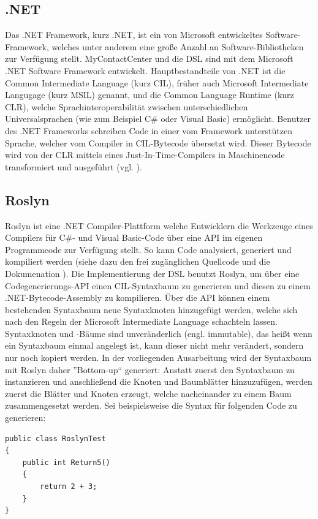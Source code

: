 \subsection{.NET}
\label{subsec:DotNet}
Das .NET Framework, kurz .NET, ist ein von Microsoft entwickeltes Software-Framework, welches unter anderem eine große Anzahl an Software-Bibliotheken zur Verfügung stellt. MyContactCenter und die DSL sind mit dem Microsoft .NET Software Framework entwickelt. Hauptbestandteile von .NET ist die Common Intermediate Language (kurz CIL), früher auch Microsoft Intermediate Langugage (kurz MSIL) genannt, und die Common Language Runtime (kurz CLR), welche Sprachinteroperabilität zwischen unterschiedlichen Universalsprachen (wie zum Beispiel C\# oder Visual Basic) ermöglicht. Benutzer des .NET Frameworks schreiben Code in einer vom Framework unterstützen Sprache, welcher vom Compiler in CIL-Bytecode übersetzt wird. Dieser Bytecode wird von der CLR mittels eines Just-In-Time-Compilers in Maschinencode transformiert und ausgeführt (vgl. \cite[S. 16ff]{Platt:03}).

\subsection{Roslyn}
\label{subsec:Roslyn}
Roslyn ist eine .NET Compiler-Plattform welche Entwicklern die Werkzeuge eines Compilers für C\#- und Visual Basic-Code über eine API im eigenen Programmcode zur Verfügung stellt. So kann Code analysiert, generiert und kompiliert werden (siehe dazu den frei zugänglichen Quellcode und die Dokumenation \cite{Roslyn}). Die Implementierung der DSL benutzt Roslyn, um über eine Codegenerierungs-API einen CIL-Syntaxbaum zu generieren und diesen zu einem .NET-Bytecode-Assembly zu kompilieren. Über die API können einem bestehenden Syntaxbaum neue Syntaxknoten hinzugefügt werden, welche sich nach den Regeln der Microsoft Intermediate Language schachteln lassen. Syntaxknoten und -Bäume sind unveränderlich (engl. immutable), das heißt wenn ein Syntaxbaum einmal angelegt ist, kann dieser nicht mehr verändert, sondern nur noch kopiert werden. In der vorliegenden Ausarbeitung wird der Syntaxbaum mit Roslyn daher ''Bottom-up`` generiert: Anstatt zuerst den Syntaxbaum zu instanzieren und anschließend die Knoten und Baumblätter hinzuzufügen, werden zuerst die Blätter und Knoten erzeugt, welche nacheinander zu einem Baum zusammengesetzt werden. Sei beispielsweise die Syntax für folgenden Code zu generieren:
\noindent
\begin{lstlisting}[language=custom]
public class RoslynTest
{
    public int Return5()
    {
        return 2 + 3;
    }
}
\end{lstlisting}

